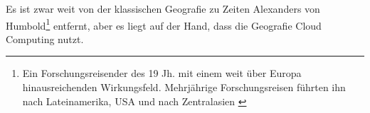 Es ist zwar weit von der klassischen Geografie zu Zeiten Alexanders von Humbold\footnote{Ein Forschungsreisender des 19 Jh. mit einem weit über Europa hinausreichenden Wirkungsfeld. Mehrjährige Forschungsreisen führten ihn nach Lateinamerika, USA und nach Zentralasien \cite{Kehlmann2005}} entfernt, aber es liegt auf der Hand, dass die Geografie Cloud Computing nutzt.